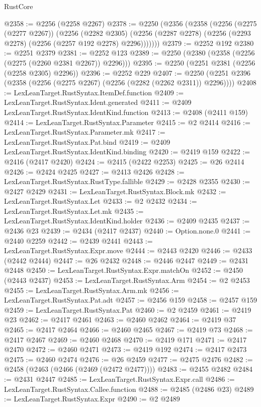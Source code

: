 \begin{lexlean}{RustCore}
\begin{coremodule}
@2358 := @2256 (@2258 @2267)
@2378 := @2250
    (@2356
      (@2358
        (@2256
          (@2275 (@2277 @2267))
          (@2256
            (@2282 @2305)
            (@2256 (@2287 @2278) (@2256 (@2293 @2278) (@2256 (@2257 @192 @2278) @2296)))))))
@2379 := @2252 @192
@2380 := @2251 @2379
@2381 := @2252 @123
@2389 := @2250 (@2380 (@2358 (@2256 (@2275 (@2260 @2381 @2267)) @2296)))
@2395 := @2250 (@2251 @2381 (@2256 (@2258 @2305) @2296))
@2396 := @2252 @229
@2407 := @2250 (@2251 @2396 (@2358 (@2256 (@2275 @2267) (@2256 (@2282 (@2262 @2311)) @2296))))
@2408 := LexLeanTarget.RustSyntax.ItemDef.function
@2409 := LexLeanTarget.RustSyntax.Ident.generated
@2411 := @2409 LexLeanTarget.RustSyntax.IdentKind.function
@2413 := @2408 (@2411 @159)
@2414 := LexLeanTarget.RustSyntax.Parameter
@2415 := @2 @2414
@2416 := LexLeanTarget.RustSyntax.Parameter.mk
@2417 := LexLeanTarget.RustSyntax.Pat.bind
@2419 := @2409 LexLeanTarget.RustSyntax.IdentKind.binding
@2420 := @2419 @159
@2422 := @2416 (@2417 @2420)
@2424 := @2415 (@2422 @2253)
@2425 := @26 @2414
@2426 := @2424 @2425
@2427 := @2413 @2426
@2428 := LexLeanTarget.RustSyntax.RustType.fallible
@2429 := @2428 @2355
@2430 := @2427 @2429
@2431 := LexLeanTarget.RustSyntax.Block.mk
@2432 := LexLeanTarget.RustSyntax.Let
@2433 := @2 @2432
@2434 := LexLeanTarget.RustSyntax.Let.mk
@2435 := LexLeanTarget.RustSyntax.IdentKind.holder
@2436 := @2409 @2435
@2437 := @2436 @23
@2439 := @2434 (@2417 @2437)
@2440 := Option.none.{0}
@2441 := @2440 @2259
@2442 := @2439 @2441
@2443 := LexLeanTarget.RustSyntax.Expr.move
@2444 := @2443 @2420
@2446 := @2433 (@2442 @2444)
@2447 := @26 @2432
@2448 := @2446 @2447
@2449 := @2431 @2448
@2450 := LexLeanTarget.RustSyntax.Expr.matchOn
@2452 := @2450 (@2443 @2437)
@2453 := LexLeanTarget.RustSyntax.Arm
@2454 := @2 @2453
@2455 := LexLeanTarget.RustSyntax.Arm.mk
@2456 := LexLeanTarget.RustSyntax.Pat.adt
@2457 := @2456 @159
@2458 := @2457 @159
@2459 := LexLeanTarget.RustSyntax.Pat
@2460 := @2 @2459
@2461 := @2419 @23
@2462 := @2417 @2461
@2463 := @2460 @2462
@2464 := @2419 @37
@2465 := @2417 @2464
@2466 := @2460 @2465
@2467 := @2419 @73
@2468 := @2417 @2467
@2469 := @2460 @2468
@2470 := @2419 @171
@2471 := @2417 @2470
@2472 := @2460 @2471
@2473 := @2419 @192
@2474 := @2417 @2473
@2475 := @2460 @2474
@2476 := @26 @2459
@2477 := @2475 @2476
@2482 := @2458 (@2463 (@2466 (@2469 (@2472 @2477))))
@2483 := @2455 @2482
@2484 := @2431 @2447
@2485 := LexLeanTarget.RustSyntax.Expr.call
@2486 := LexLeanTarget.RustSyntax.Callee.function
@2488 := @2485 (@2486 @23)
@2489 := LexLeanTarget.RustSyntax.Expr
@2490 := @2 @2489

\end{coremodule}
\end{lexlean}
